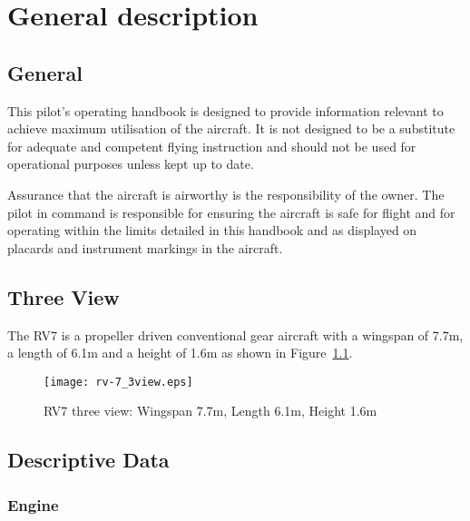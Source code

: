 \chapter{General description}
\thispagestyle{fancy}
\minitoc[n] %

\section{General}
This pilot's operating handbook is designed  to provide information relevant to achieve maximum utilisation of the aircraft.  It is not designed to be a substitute for adequate and competent flying instruction and should not be used for operational purposes unless kept up to date.

Assurance that the aircraft is airworthy is the responsibility of the owner.  The pilot in command is responsible for
ensuring the aircraft is safe for flight and for operating within the limits detailed in this handbook and as displayed on placards and instrument markings in the aircraft.

\section{Three View}
The RV7 is a propeller driven conventional gear aircraft with a wingspan of 7.7m, a length of 6.1m and a height of 1.6m as shown in Figure~\ref{fig:rv-7_3view}.

\begin{figure}[H]
\centering
\texttt{[image: rv-7\_3view.eps]}
\caption{RV7 three view: Wingspan 7.7m, Length 6.1m, Height 1.6m}
\label{fig:rv-7_3view}
\end{figure}

\section{Descriptive Data}
\subsection{Engine}

